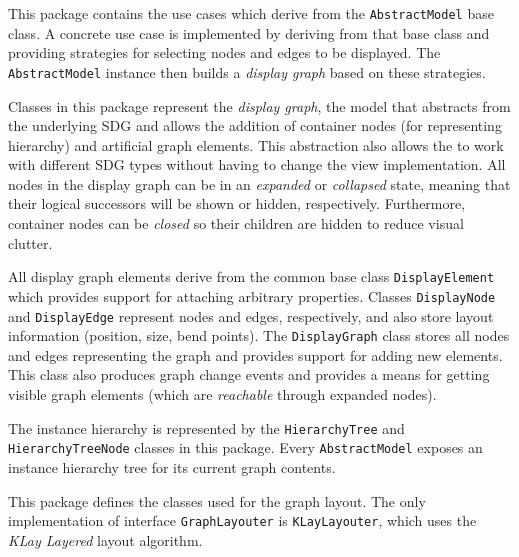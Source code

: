 \begin{description}
   This package contains the use cases which derive from the \lstinline|AbstractModel| base class. A 
  concrete use case is implemented by deriving from that base class and providing strategies for selecting nodes and 
  edges to be displayed. The \lstinline|AbstractModel| instance then builds a \emph{display graph} based on these 
  strategies.
  
   Classes in this package represent the \emph{display graph}, the model that abstracts from the 
  underlying SDG and allows the addition of container nodes (for representing hierarchy) and artificial graph elements. 
  This abstraction also allows the \SB to work with different SDG types without having to change the view 
  implementation. All nodes in the display graph can be in an \emph{expanded} or \emph{collapsed} state, meaning that 
  their logical successors will be shown or hidden, respectively. Furthermore, container nodes can be \emph{closed} so 
  their children are hidden to reduce visual clutter.
  
  All display graph elements derive from the common base class \lstinline|DisplayElement| which provides support for 
  attaching arbitrary properties. Classes \lstinline|DisplayNode| and \lstinline|DisplayEdge| represent nodes and 
  edges, respectively, and also store layout information (position, size, bend points). The \lstinline|DisplayGraph| 
  class stores all nodes and edges representing the graph and provides support for adding new elements. This class also 
  produces graph change events and provides a means for getting visible graph elements (which are \emph{reachable} 
  through expanded nodes).
  
   The instance hierarchy is represented by the \lstinline|HierarchyTree| and 
  \lstinline|HierarchyTreeNode| classes in this package. Every \lstinline|AbstractModel| exposes an instance hierarchy 
  tree for its current graph contents.
  
   This package defines the classes used for the graph layout. The only implementation of 
  interface \lstinline|GraphLayouter| is \lstinline|KLayLayouter|, which uses the \emph{KLay Layered}\footnotemark{} 
  layout algorithm.
  
  

\end{description}
